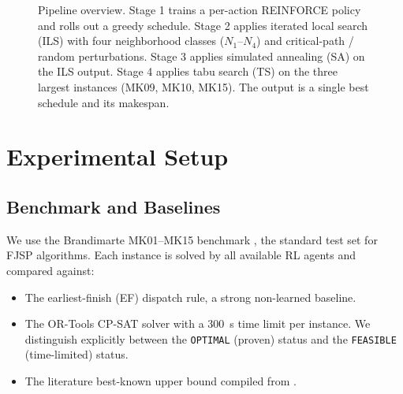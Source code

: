\documentclass[10pt]{article}
\theoremstyle{definition}
\begin{document}
\begin{figure}[t]
\caption{Pipeline overview. Stage 1 trains a per-action REINFORCE
policy and rolls out a greedy schedule. Stage 2 applies iterated
local search (ILS) with four neighborhood classes
($N_1$--$N_4$) and critical-path / random perturbations. Stage 3
applies simulated annealing (SA) on the ILS output. Stage 4
applies tabu search (TS) on the three largest instances
(MK09, MK10, MK15). The output is a single best schedule and
its makespan.}
\label{fig:pipeline}
\end{figure}

\section{Experimental Setup}

\subsection{Benchmark and Baselines}

We use the Brandimarte MK01--MK15 benchmark
\citep{Brandimarte1993}, the standard test set for FJSP
algorithms. Each instance is solved by all available
RL agents and compared against:
\begin{itemize}
  \item The earliest-finish (EF) dispatch rule, a strong
        non-learned baseline.
  \item The OR-Tools CP-SAT solver
        \citep{Perron2022ORtools} with a 300~s time
        limit per instance. We distinguish explicitly
        between the \texttt{OPTIMAL} (proven) status and
        the \texttt{FEASIBLE} (time-limited) status.
  \item The literature best-known upper bound compiled
        from \citet{Song2022TII, Yang2024, Lei2022,
        Stutzle2006ILS}.
\end{itemize}
\end{document}
